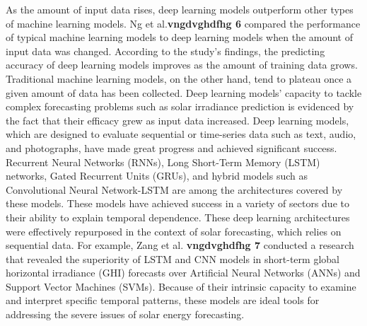 \documentclass[a4paper,fleqn]{cas-sc}
\begin{document}
As the amount of input data rises, deep learning models outperform other types of machine learning models. Ng et al.\textbf{vngdvghdfhg 6} compared the performance of typical machine learning models to deep learning models when the amount of input data was changed. According to the study's findings, the predicting accuracy of deep learning models improves as the amount of training data grows. Traditional machine learning models, on the other hand, tend to plateau once a given amount of data has been collected. Deep learning models' capacity to tackle complex forecasting problems such as solar irradiance prediction is evidenced by the fact that their efficacy grew as input data increased. Deep learning models, which are designed to evaluate sequential or time-series data such as text, audio, and photographs, have made great progress and achieved significant success. Recurrent Neural Networks (RNNs), Long Short-Term Memory (LSTM) networks, Gated Recurrent Units (GRUs), and hybrid models such as Convolutional Neural Network-LSTM are among the architectures covered by these models. These models have achieved success in a variety of sectors due to their ability to explain temporal dependence.
These deep learning architectures were effectively repurposed in the context of solar forecasting, which relies on sequential data. For example, Zang et al. \textbf{vngdvghdfhg 7} conducted a research that revealed the superiority of LSTM and CNN models in short-term global horizontal irradiance (GHI) forecasts over Artificial Neural Networks (ANNs) and Support Vector Machines (SVMs). Because of their intrinsic capacity to examine and interpret specific temporal patterns, these models are ideal tools for addressing the severe issues of solar energy forecasting.
\end{document}
